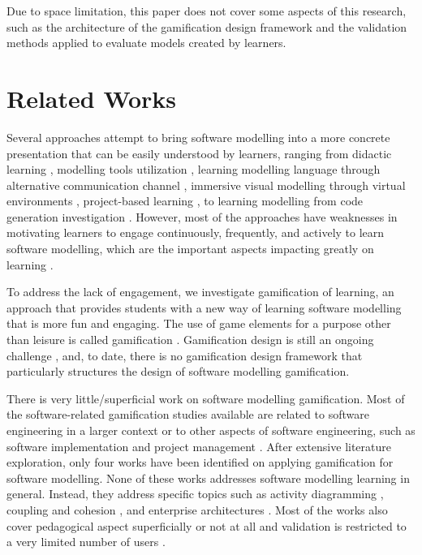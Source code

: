 \documentclass[runningheads,a4paper]{llncs}
\begin{document}
Due to space limitation, this paper does not cover some aspects of this research, such as the architecture of the gamification design framework and the validation methods applied to evaluate models created by learners. 

\section{Related Works}
Several approaches attempt to bring software modelling into a more concrete presentation that can be easily understood by learners, ranging from didactic learning \cite{moisan2009teaching}, modelling tools utilization \cite{Akayama2013}, learning modelling language through alternative communication channel \cite{Brandsteidl2011}, immersive visual modelling through virtual environments \cite{neubauer2003immersive}, project-based learning \cite{Szmurlo2007}, to learning modelling from code generation investigation \cite{schmidt2014teaching}. However, most of the approaches have weaknesses in motivating learners to engage continuously, frequently, and actively to learn software modelling, which are the important aspects impacting greatly on learning \cite{Naps2005}. 

To address the lack of engagement, we investigate gamification of learning, an approach that provides students with a new way of learning software modelling that is more fun and engaging. The use of game elements for a purpose other than leisure is called gamification \cite{deterding2011game}. Gamification design is still an ongoing challenge \cite{Deterding2013}, and, to date, there is no gamification design framework that particularly structures the design of software modelling gamification.

There is very little/superficial work on software modelling gamification. Most of the software-related gamification studies available are related to software engineering in a larger context or to other aspects of software engineering, such as software implementation and project management \cite{Pedreira2015}. After extensive literature exploration, only four works have been identified on applying gamification for software modelling. None of these works addresses software modelling learning in general. Instead, they address specific topics such as activity diagramming \cite{Richardsen2014}, coupling and cohesion \cite{Stikkolorum2014}, and enterprise architectures \cite{Groenewegen2010} \cite{Ionita2015}. Most of the works also cover pedagogical aspect superficially or not at all and validation is restricted to a very limited number of users \cite{Richardsen2014}\cite{Stikkolorum2014}\cite{Groenewegen2010}.
\end{document}
